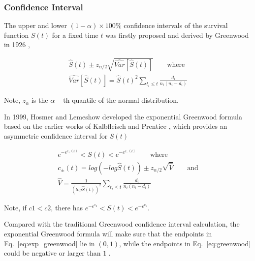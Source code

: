 \subsubsection{Confidence Interval}

The upper and lower $(1-\alpha) \times 100 \%$ confidence intervals of the survival function $S(t)$ for a fixed time $t$ was firstly proposed and derived by Greenwood in 1926 \cite{greenwoodnatural},


\begin{align} \label{eq:greenwood}
  \widehat{S}(t) \pm z_{\alpha / 2} \sqrt{\widehat{Var}[\widehat{S}(t)]}
  \qquad\text{where}\\
  \widehat{Var}[\widehat{S}(t)] = \widehat{S}(t)^2\sum_{t_i \leq t} \frac{d_i}{n_i(n_i - d_i)}
\end{align}

Note, $z_{\alpha}$ is the $\alpha -$th quantile of the normal distribution.

In 1999, Hosmer and Lemeshow \cite{hosmer2011applied} developed the exponential Greenwood formula based on the earlier works of Kalbfleisch and Prentice \cite{kalbfleisch2011statistical}, which provides an asymmetric confidence interval for $S(t)$

\begin{align} \label{eq:exp_greenwood}
  e^{-e^{c_{+}(t)}} < S(t) < e^{-e^{c_{-}(t)}}
  \qquad\text{where}\\
  c_{\pm}(t) = log(-log\widehat{S}(t)) \pm z_{\alpha / 2} \sqrt{\widehat{V}}
  \qquad\text{and}\\
  \widehat{V} = \frac{1}{(log\widehat{S}(t))^2} \sum_{t_i \leq t} \frac{d_i}{n_i(n_i - d_i)}
\end{align}

Note, if $c1<c2$, there has $e^{-e^{c_2}} < S(t) < e^{-e^{c_1}}$.


Compared with the traditional Greenwood confidence interval calculation, the exponential Greenwood formula will make sure that the endpoints in Eq.~\ref{eq:exp_greenwood} lie in $(0, 1)$, while the endpoints in Eq.~\ref{eq:greenwood} could be negative or larger than $1$ \cite{sawyer2003greenwood}. 




